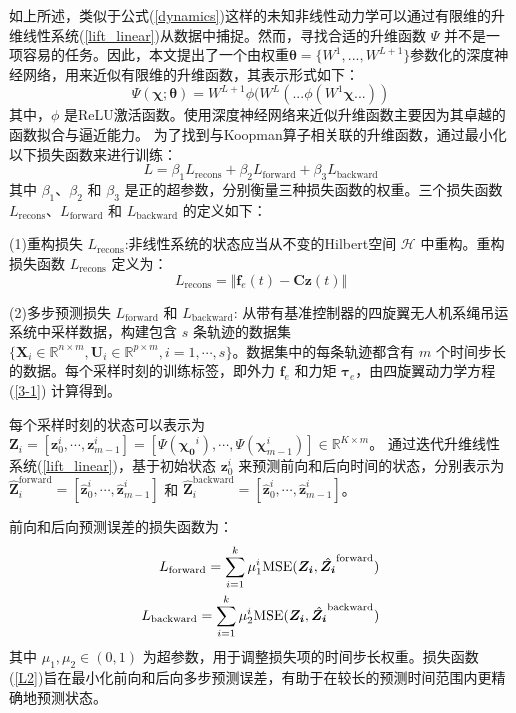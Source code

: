 \documentclass[lang=chs, degree=master, blindreview=false, winfonts=true]{yanputhesis}
\begin{document}
如上所述，类似于公式(\ref{dynamics})这样的未知非线性动力学可以通过有限维的升维线性系统(\ref{lift_linear})从数据中捕捉。然而，寻找合适的升维函数 ${\Psi}$ 并不是一项容易的任务。因此，本文提出了一个由权重$\bm{\theta} = \{W^1, ..., W^{L+1}\}$参数化的深度神经网络，用来近似有限维的升维函数，其表示形式如下：
\begin{equation}
	{\Psi}(\bm \chi;\bm{\theta}) = W^{L+1}\phi(W^L(...\phi(W^1 \bm \chi...)) \label{dnn}
\end{equation}
其中，$\phi$ 是ReLU激活函数。使用深度神经网络来近似升维函数主要因为其卓越的函数拟合与逼近能力。
为了找到与Koopman算子相关联的升维函数，通过最小化以下损失函数来进行训练：
\begin{equation}
	L = \beta_1 L_{\text{recons}} + \beta_2 L_{\text{forward}} + \beta_3 L_{\text{backward}}
\end{equation}
其中 $\beta_1$、$\beta_2$ 和 $\beta_3$ 是正的超参数，分别衡量三种损失函数的权重。三个损失函数 $L_{\text{recons}}$、$L_{\text{forward}}$ 和 $L_{\text{backward}}$ 的定义如下：

(1)重构损失 $L_{\text{recons}}$:非线性系统的状态应当从不变的Hilbert空间 $\mathcal{H}$ 中重构。重构损失函数 $L_{\text{recons}}$ 定义为：
\begin{equation}
	L_{\text{recons}}=\Vert \bm{f}_e(t) - \bm{C} \bm{z}(t) \Vert
\end{equation}

(2)多步预测损失 $L_{\text{forward}}$ 和 $L_{\text{backward}}$: 从带有基准控制器的四旋翼无人机系绳吊运系统中采样数据，构建包含 $s$ 条轨迹的数据集 $\{\bm{X}_i \in \mathbb{R}^{n\times m}, \bm{U}_i \in \mathbb{R}^{p \times m}, i=1,\cdots,s\}$。数据集中的每条轨迹都含有 $m$ 个时间步长的数据。每个采样时刻的训练标签，即外力 $\bm{f}_e$ 和力矩 $\bm{\tau}_e$，由四旋翼动力学方程 (\ref{3-1}) 计算得到。

每个采样时刻的状态可以表示为 $\bm{Z}_i = [\bm{z}_0^i,\cdots,\bm{z}_{m-1}^i]=[{\Psi}(\bm{\chi_{0}}^i),\cdots,{\Psi}(\bm{\chi}_{m-1}^i)]\in \mathbb{R}^{K\times m}$。
通过迭代升维线性系统(\ref{lift_linear})，基于初始状态 $\bm{z}_0^i$ 来预测前向和后向时间的状态，分别表示为$\hat{\bm{Z}}_i^{\text{forward}} = [\hat{\bm{z}}_0^i, \cdots, \hat{\bm{z}}_{m-1}^i]$ 和 $\hat{\bm{Z}}_i^{\text{backward}} = [\hat{\bm{z}}_0^i, \cdots, \hat{\bm{z}}_{m-1}^i]$。


前向和后向预测误差的损失函数为：
\begin{equation}
	\begin{aligned}
		L_{\text{forward}} = \sum_{i=1}^{k} \mu_1^{i} {\rm MSE}(\bm{Z_{i}},\hat{\bm{Z_{i}}}^{\text{forward}})  \\
		L_{\text{backward}} = \sum_{i=1}^{k} \mu_2^{i} {\rm MSE}(\bm{Z_{i}},\hat{\bm{Z_{i}}}^{\text{backward}})\label{L2}
	\end{aligned}
\end{equation}
其中 $\mu_1,\mu_2 \in(0,1)$ 为超参数，用于调整损失项的时间步长权重。损失函数(\ref{L2})旨在最小化前向和后向多步预测误差，有助于在较长的预测时间范围内更精确地预测状态。
\end{document}
